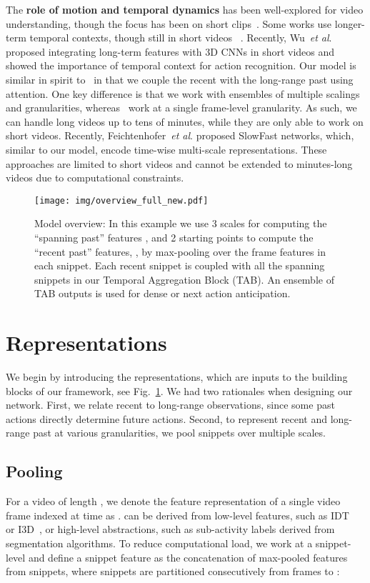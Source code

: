 \documentclass[runningheads]{llncs}
\newcommand{\etal}{\textit{et al}. }
\begin{document}
The \textbf{role of motion and temporal dynamics} has been well-explored for video understanding, though the focus has been on short clips~\cite{lin2019tsm,carreira2017quo,huang2018makes}. Some works use longer-term temporal contexts, though still in short videos  ~\cite{li2017temporal,nonlocalNetVLAD}. Recently, Wu~\etal\cite{lfb2019} proposed integrating long-term features with 3D CNNs in short videos and showed the importance of temporal context for action recognition. Our model is similar in spirit to~\cite{lfb2019} in that we couple the recent with the long-range past using attention. One key difference is that we work with ensembles of multiple scalings and granularities, whereas~\cite{lfb2019} work at a single frame-level granularity. As such, we can handle long videos up to tens of minutes, while they are only able to work on short videos. Recently, Feichtenhofer~\etal\cite{feichtenhofer2019slowfast} proposed SlowFast networks, which, similar to our model, encode time-wise multi-scale representations.  These approaches are limited to short videos and cannot be extended to minutes-long videos due to computational constraints. 

\begin{figure} 
\centering 
\texttt{[image: img/overview\_full\_new.pdf]}
\caption{Model overview: In this example we use 3 scales for computing the ``spanning past'' features , and 2 starting points to compute the ``recent past'' features, , by max-pooling over the frame features in each snippet. Each recent snippet is coupled with all the spanning snippets in our Temporal Aggregation Block (TAB). An ensemble of TAB outputs is used for dense or next action anticipation.}
\label{fig:overview_new}
\end{figure}

\section{Representations}
We begin by introducing the representations, which are inputs to the building blocks of our framework, see Fig.~\ref{fig:overview_new}. We had two rationales when designing our network. First, we relate recent to long-range observations, since some past actions directly determine future actions. Second, to represent recent and long-range past at various granularities, we pool snippets over multiple scales. 
  
\subsection{Pooling} 
For a video of length , we denote the feature representation of a single video frame indexed at time  as .  can be derived from low-level features, such as IDT~\cite{wang2013action} or I3D~\cite{carreira2017quo}, or high-level abstractions, such as sub-activity labels derived from segmentation algorithms. To reduce computational load, we work at a snippet-level and define a snippet feature  as the concatenation of max-pooled features from  snippets, where snippets are partitioned consecutively from frames  to : 
\end{document}
